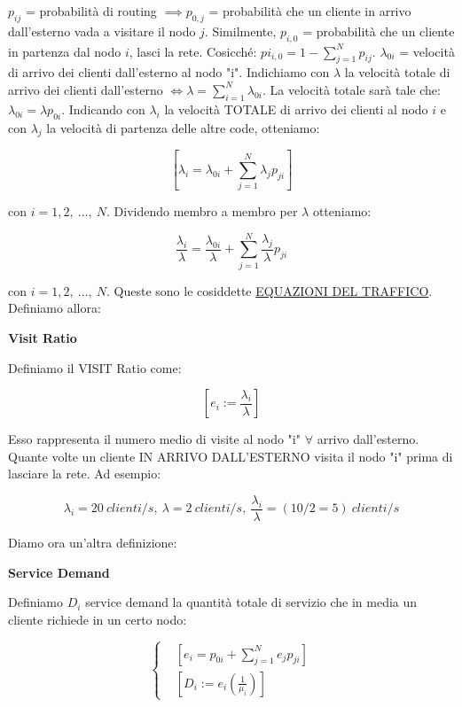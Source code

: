$p_{ij}$ = probabilità di routing $\implies p_{0,j}$ = probabilità che un cliente in arrivo dall'esterno vada a visitare il nodo $j$. Similmente, $p_{i,0}$ = probabilità che un cliente in partenza dal nodo $i$, lasci la rete. Cosicché: $pi_{i,0} = 1-\sum_{j=1}^N{p_{ij}}$. $\lambda_{0i}$ = velocità di arrivo dei clienti dall'esterno al nodo "i". Indichiamo con $\lambda$ la velocità totale di arrivo dei clienti dall'esterno $\iff \lambda=\sum_{i=1}^N{\lambda_{0i}}$. La velocità totale sarà tale che: $\lambda_{0i}=\lambda p_{0i}$. Indicando con $\lambda_i$ la velocità TOTALE di arrivo dei clienti al nodo $i$ e con $\lambda_j$ la velocità di partenza delle altre code, otteniamo:

\[
	[\lambda_i=\lambda_{0i}+\sum_{j=1}^N{\lambda_jp_{ji}}]
\]

con $i=1,2,\ \dots,\ N$. Dividendo membro a membro per $\lambda$ otteniamo:

\[	
	\frac{\lambda_i}{\lambda} = \frac{\lambda_{0i}}{\lambda} + \sum_{j=1}^N{\frac{\lambda_j}{\lambda}p_{ji}}
\]

con $i=1,2,\ \dots,\ N$. Queste sono le cosiddette \underline{EQUAZIONI DEL TRAFFICO}. Definiamo allora:

\begin{defn}{\textbf{Visit Ratio}}

Definiamo il VISIT Ratio come:

\[
	[e_i := \frac{\lambda_i}{\lambda}]
\]
\end{defn}

Esso rappresenta il numero medio di visite al nodo "i" $\forall$ arrivo dall'esterno. Quante volte un cliente IN ARRIVO DALL'ESTERNO visita il nodo "i" prima di lasciare la rete. Ad esempio:

\[	
	\lambda_i=20\ clienti/s,\ \lambda=2\ clienti/s,\ \frac{\lambda_i}{\lambda}=(10/2 = 5)\ clienti/s
\]

Diamo ora un'altra definizione:

\begin{defn}{\textbf{Service Demand}}

Definiamo $D_i$ service demand la quantità totale di servizio che in media un cliente richiede in un certo nodo:

\[
	\left\{
	\begin{aligned}
	&[e_i = p_{0i} + \sum_{j=1}^N{e_jp_{ji}}]\\
	&[D_i := e_i(\frac{1}{\mu_i})]
	\end{aligned}
	\right.
\]

\end{defn}

